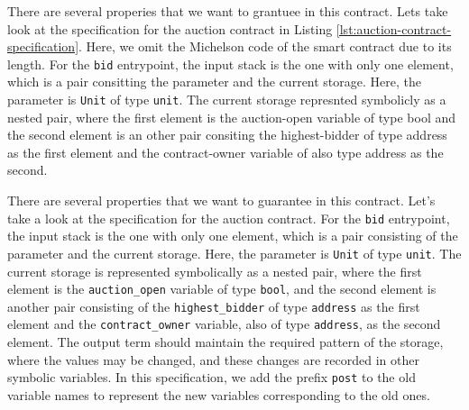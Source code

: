 \documentclass[a4paper,UKenglish,cleveref, autoref, thm-restate]{lipics-v2021}
\begin{document}
There are several properies that we want to grantuee in this contract. Lets take look at the specification for the auction contract in Listing \ref{lst:auction-contract-specification}. Here, we omit the Michelson code  of the smart contract due to its length. For the  \lstinline/bid/ entrypoint, the input stack is  the one with only one element, which is a pair consitting the parameter and the current storage. Here, the parameter is \lstinline/Unit/ of type \lstinline/unit/. The current storage represnted symbolicly as a nested pair, where the first element is the auction-open variable of type bool and the second element is an other pair consiting the highest-bidder of type address as the first element and the contract-owner variable of also type address as the second. 

There are several properties that we want to guarantee in this contract. Let's take a look at the specification for the auction contract. For the \lstinline/bid/ entrypoint, the input stack is the one with only one element, which is a pair consisting of the parameter and the current storage. Here, the parameter is \lstinline/Unit/ of type \lstinline/unit/. The current storage is represented symbolically as a nested pair, where the first element is the \lstinline/auction_open/ variable of type \lstinline/bool/, and the second element is another pair consisting of the \lstinline/highest_bidder/ of type \lstinline/address/ as the first element and the \lstinline/contract_owner/ variable, also of type \lstinline/address/, as the second element. The output term should maintain the required pattern of the storage, where the values may be changed, and these changes are recorded in other symbolic variables. In this specification, we add the prefix \lstinline/post/ to the old variable names to represent the new variables corresponding to the old ones. 
\end{document}
